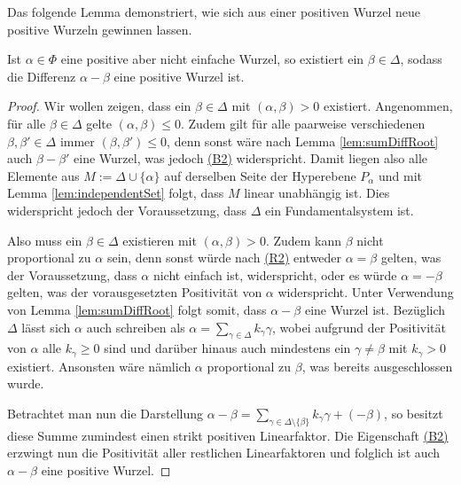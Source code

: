 Das folgende Lemma demonstriert, wie sich aus einer positiven Wurzel neue positive Wurzeln gewinnen lassen.

\begin{lem}
  \label{lem:posRootNewRoot}
  Ist $\alpha \in \Phi$ eine positive aber nicht einfache Wurzel, so existiert ein $\beta \in \Delta$, sodass die Differenz $\alpha - \beta$ eine positive Wurzel ist.
\end{lem}

\begin{proof}
  Wir wollen zeigen, dass ein $\beta \in \Delta$ mit $(\alpha, \beta) > 0$ existiert.
  Angenommen, für alle $\beta \in \Delta$ gelte $(\alpha, \beta) \leq 0$.
  Zudem gilt für alle paarweise verschiedenen $\beta, \beta' \in \Delta$ immer $(\beta, \beta') \leq 0$, denn sonst wäre nach Lemma \ref{lem:sumDiffRoot} auch $\beta - \beta'$ eine Wurzel, was jedoch \hyperref[it:B2]{(B2)} widerspricht.
  Damit liegen also alle Elemente aus $M := \Delta \cup \{\alpha\}$ auf derselben Seite der Hyperebene $P_\alpha$ und mit Lemma \ref{lem:independentSet} folgt, dass $M$ linear unabhängig ist.
  Dies widerspricht jedoch der Voraussetzung, dass $\Delta$ ein Fundamentalsystem ist.

  Also muss ein $\beta \in \Delta$ existieren mit $(\alpha, \beta) > 0$.
  Zudem kann $\beta$ nicht proportional zu $\alpha$ sein, denn sonst würde nach \hyperref[it:R2]{(R2)} entweder $\alpha = \beta$ gelten, was der Voraussetzung, dass $\alpha$ nicht einfach ist, widerspricht, oder es würde $\alpha = -\beta$ gelten, was der vorausgesetzten Positivität von $\alpha$ widerspricht.
  Unter Verwendung von Lemma \ref{lem:sumDiffRoot} folgt somit, dass $\alpha - \beta$ eine Wurzel ist.
  Bezüglich $\Delta$ lässt sich $\alpha$ auch schreiben als $\alpha = \sum_{\gamma \in \Delta} k_\gamma \gamma$, wobei aufgrund der Positivität von $\alpha$ alle $k_\gamma \geq 0$ sind und darüber hinaus auch mindestens ein $\gamma \neq \beta$ mit  $k_\gamma > 0$ existiert.
  Ansonsten wäre nämlich $\alpha$ proportional zu $\beta$, was bereits ausgeschlossen wurde.

  Betrachtet man nun die Darstellung $\alpha - \beta = \sum_{\gamma \in \Delta \setminus \{\beta\}} k_\gamma \gamma + (- \beta)$, so besitzt diese Summe zumindest einen strikt positiven Linearfaktor.
  Die Eigenschaft \hyperref[it:B2]{(B2)} erzwingt nun die Positivität aller restlichen Linearfaktoren und folglich ist auch $\alpha - \beta$ eine positive Wurzel.
\end{proof}
 
